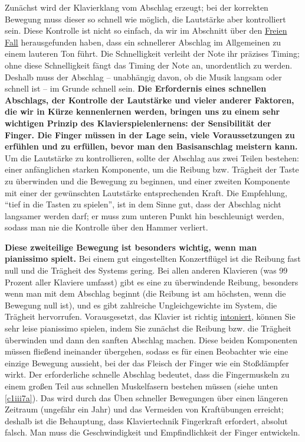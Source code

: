Zunächst wird der Klavierklang vom Abschlag erzeugt; bei der korrekten Bewegung muss dieser so schnell wie möglich, die Lautstärke aber kontrolliert sein.
Diese Kontrolle ist nicht so einfach, da wir im Abschnitt über den \hyperref[c1ii10]{Freien Fall} herausgefunden haben, dass ein schnellerer Abschlag im Allgemeinen zu einem lauteren Ton führt.
Die Schnelligkeit verleiht der Note ihr präzises Timing; ohne diese Schnelligkeit fängt das Timing der Note an, unordentlich zu werden.
Deshalb muss der Abschlag -- unabhängig davon, ob die Musik langsam oder schnell ist -- im Grunde schnell sein.
\textbf{Die Erfordernis eines schnellen Abschlags, der Kontrolle der Lautstärke und vieler anderer Faktoren, die wir in Kürze kennenlernen werden, bringen uns zu einem sehr wichtigen Prinzip des Klavierspielenlernens: der Sensibilität der Finger.
Die Finger müssen in der Lage sein, viele Voraussetzungen zu erfühlen und zu erfüllen, bevor man den Basisanschlag meistern kann.}
Um die Lautstärke zu kontrollieren, sollte der Abschlag aus zwei Teilen bestehen: einer anfänglichen starken Komponente, um die Reibung bzw. Trägheit der Taste zu überwinden und die Bewegung zu beginnen, und einer zweiten Komponente mit einer der gewünschten Lautstärke entsprechenden Kraft.
Die Empfehlung, \enquote{tief in die Tasten zu spielen}, ist in dem Sinne gut, dass der Abschlag nicht langsamer werden darf; er muss zum unteren Punkt hin beschleunigt werden, sodass man nie die Kontrolle über den Hammer verliert.

\textbf{Diese zweiteilige Bewegung ist besonders wichtig, wenn man pianissimo spielt.}
Bei einem gut eingestellten Konzertflügel ist die Reibung fast null und die Trägheit des Systems gering.
Bei allen anderen Klavieren (was 99 Prozent aller Klaviere umfasst) gibt es eine zu überwindende Reibung, besonders wenn man mit dem Abschlag beginnt (die Reibung ist am höchsten, wenn die Bewegung null ist), und es gibt zahlreiche Ungleichgewichte im System, die Trägheit hervorrufen.
Vorausgesetzt, das Klavier ist richtig \hyperref[c2_7_hamm]{intoniert}, können Sie sehr leise pianissimo spielen, indem Sie zunächst die Reibung bzw. die Trägheit überwinden und dann den sanften Abschlag machen.
Diese beiden Komponenten müssen fließend ineinander übergehen, sodass es für einen Beobachter wie eine einzige Bewegung aussieht, bei der das Fleisch der Finger wie ein Stoßdämpfer wirkt.
Der erforderliche schnelle Abschlag bedeutet, dass die Fingermuskeln zu einem großen Teil aus schnellen Muskelfasern bestehen müssen (siehe unten \hyperref[c1iii7a]{\autoref{c1iii7a}}).
Das wird durch das Üben schneller Bewegungen über einen längeren Zeitraum (ungefähr ein Jahr) und das Vermeiden von Kraftübungen erreicht; deshalb ist die Behauptung, dass Klaviertechnik Fingerkraft erfordert, absolut falsch.
Man muss die Geschwindigkeit und Empfindlichkeit der Finger entwickeln.

